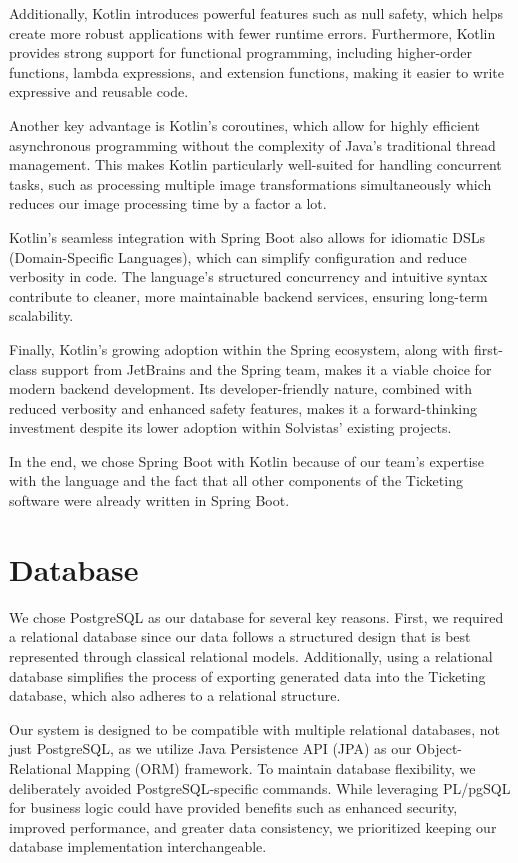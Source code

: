 Additionally, Kotlin introduces powerful features such as null safety, which helps create more robust applications with fewer runtime errors. Furthermore, Kotlin provides strong support for functional programming, including higher-order functions, lambda expressions, and extension functions, making it easier to write expressive and reusable code.

Another key advantage is Kotlin’s coroutines, which allow for highly efficient asynchronous programming without the complexity of Java’s traditional thread management. This makes Kotlin particularly well-suited for handling concurrent tasks, such as processing multiple image transformations simultaneously which reduces our image processing time by a factor a lot.

Kotlin’s seamless integration with Spring Boot also allows for idiomatic DSLs (Domain-Specific Languages), which can simplify configuration and reduce verbosity in code. The language’s structured concurrency and intuitive syntax contribute to cleaner, more maintainable backend services, ensuring long-term scalability.

Finally, Kotlin’s growing adoption within the Spring ecosystem, along with first-class support from JetBrains and the Spring team, makes it a viable choice for modern backend development. Its developer-friendly nature, combined with reduced verbosity and enhanced safety features, makes it a forward-thinking investment despite its lower adoption within Solvistas’ existing projects.

In the end, we chose Spring Boot with Kotlin because of our team’s expertise with the language and the fact that all other components of the Ticketing software were already written in Spring Boot.

\section{Database}
We chose PostgreSQL as our database for several key reasons. First, we required a relational database since our data follows a structured design that is best represented through classical relational models. Additionally, using a relational database simplifies the process of exporting generated data into the Ticketing database, which also adheres to a relational structure.

Our system is designed to be compatible with multiple relational databases, not just PostgreSQL, as we utilize Java Persistence API (JPA) as our Object-Relational Mapping (ORM) framework. To maintain database flexibility, we deliberately avoided PostgreSQL-specific commands. While leveraging PL/pgSQL for business logic could have provided benefits such as enhanced security, improved performance, and greater data consistency, we prioritized keeping our database implementation interchangeable.

